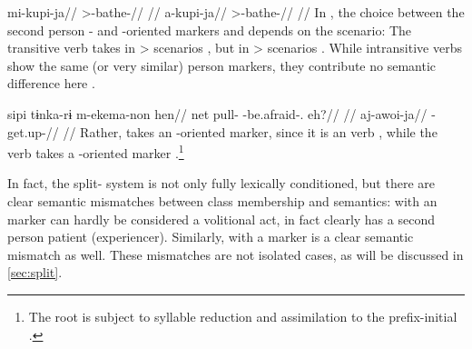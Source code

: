  \kalina
{}
\begingl
\gla mi-kupi-ja//
\glb {}>-bathe-//
\glft {} \parencite[][160]{hoff1968carib}//
\endgl
{}
\begingl
\gla a-kupi-ja//
\glb {}>-bathe-//
\glft {} \parencite[][63]{yamada2011evidentiality}//
\endgl
\xe
%
In , the choice between the second person - and -oriented markers  and  depends on the scenario:
The transitive verb   takes  in > scenarios , but  in > scenarios .
While intransitive verbs show the same (or very similar) person markers, they contribute no semantic difference here .

 \kalina
{}
\begingl
\gla sipi tɨnka-rɨ m-ekema-non hen//
\glb net pull- -be.afraid-. eh?//
\glft {} \parencite[][253]{courtz2008carib}//
\endgl
{}
\begingl
\gla aj-awoi-ja//
\glb {}-get.up-//
\glft {} \parencite[][167]{hoff1968carib}//
\endgl
\xe
%
Rather,   takes an -oriented marker, since it is an  verb , while the  verb   takes a -oriented marker .\footnote{The root   is subject to syllable reduction and assimilation to the prefix-initial .}

In fact, the split- system is not only fully lexically conditioned, but there are clear semantic mismatches between class membership and semantics:
 with an  marker can hardly be considered a volitional act, in fact   clearly has a second person patient (experiencer).
Similarly,  with a  marker is a clear semantic mismatch as well.
These mismatches are not isolated cases, as will be discussed in \cref{sec:split}.

